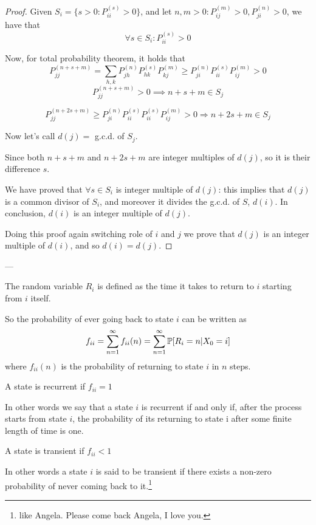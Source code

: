 	\begin{proof}
		Given $S_i = \{ s>0 : P_{ii}^{(s)} >0 \}$, and let $n, m > 0 : P_{ij}^{(m)} > 0, P_{ji}^{(n)} > 0$, we have that $$\forall s \in S_i : P_{ii}^{(s)} > 0$$

		Now, for total probability theorem, it holds that
		$$ P_{jj}^{(n+s+m)} = \sum\limits_{h, k} P_{jh}^{(n)} P_{hk}^{(s)} P_{kj}^{(m)} \geq P_{ji}^{(n)} P_{ii}^{(s)} P_{ij}^{(m)} >0 $$
		$$ P_{jj}^{(n+s+m)} >0 \implies n+s+m \in S_j$$

		$$P_{jj}^{(n+2s+m)} \geq P_{ji}^{(n)} P_{ii}^{(s)} P_{ii}^{(s)} P_{ij}^{(m)} >0 \Rightarrow n+2s+m \in S_j$$

		Now let's call $d(j) =$ g.c.d. of $S_j$.

		Since both $n+s+m$ and $n+2s+m$ are integer multiples of $d(j)$, so it is their difference $s$.

		We have proved that $\forall s \in S_i$ is integer multiple of $d(j)$: this implies that $d(j)$ is a common divisor of $S_i$, and moreover it divides the g.c.d. of $S$, $d(i)$. In conclusion, $d(i)$ is an integer multiple of $d(j)$.

		Doing this proof again switching role of $i$ and $j$ we prove that $d(j)$ is an integer multiple of $d(i)$, and so $d(i) = d(j)$.
	\end{proof}
	---

	\begin{definition}
		The random variable $R_i$ is defined as the time it takes to return to $i$ starting from $i$ itself.
	\end{definition}

	So the probability of ever going back to state $i$ can be written as
	$$ f_{ii} = \sum\limits_{n=1}^\infty f_{ii}(n)  = \sum\limits_{n=1}^\infty \mathbb{P}[R_i=n | X_0=i] $$
	where $f_{ii}(n)$ is the probability of returning to state $i$ in $n$ steps.

	\begin{definition}
		A state is recurrent if $f_{ii} = 1$
	\end{definition}
	In other words we say that a state $i$ is recurrent if and only if, after the process starts from state $i$, the probability of its returning to state i after some finite length of time is one.

	\begin{definition}
		A state is transient if  $f_{ii} < 1$
	\end{definition}

	In other words a state $i$ is said to be transient if there exists a non-zero probability of never coming back to it.\footnote{like Angela. Please come back Angela, I love you.}

